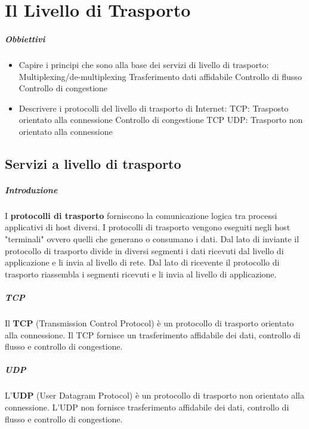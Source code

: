 \chapter{Il Livello di Trasporto}
\thispagestyle{chapterInit}
\paragraph{Obbiettivi}
    \begin{itemize}
        \item Capire i principi che sono alla base dei servizi di livello di trasporto:
            \subitem Multiplexing/de-multiplexing
            \subitem Trasferimento dati affidabile
            \subitem Controllo di flusso
            \subitem Controllo di congestione
        \item Descrivere i protocolli del livello di trasporto di Internet:
            \subitem TCP: Trasposto orientato alla connessione
            \subitem Controllo di congestione TCP
            \subitem UDP: Trasporto non orientato alla connessione
    \end{itemize}
\section{Servizi a livello di trasporto}
    \paragraph{Introduzione} I \textbf{protocolli di trasporto} forniscono la comunicazione logica tra processi applicativi di host diversi. I protocolli di trasporto vengono eseguiti negli host "terminali" ovvero quelli che generano o consumano i dati. Dal lato di inviante il protocollo di trasporto divide in diversi segmenti i dati ricevuti dal livello di applicazione e li invia al livello di rete. Dal lato di ricevente il protocollo di trasporto riassembla i segmenti ricevuti e li invia al livello di applicazione.
    \paragraph{TCP} Il \textbf{TCP} (Transmission Control Protocol) è un protocollo di trasporto orientato alla connessione. Il TCP fornisce un trasferimento affidabile dei dati, controllo di flusso e controllo di congestione.
    \paragraph{UDP} L'\textbf{UDP} (User Datagram Protocol) è un protocollo di trasporto non orientato alla connessione. L'UDP non fornisce trasferimento affidabile dei dati, controllo di flusso e controllo di congestione.
